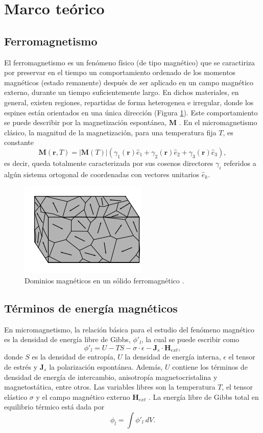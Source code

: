 \newpage
\section{Marco teórico}
\subsection{Ferromagnetismo}

El ferromagnetismo es un fenómeno físico (de tipo magnético) que se caractiriza por preservar en el tiempo un comportamiento ordenado de los momentos magnéticos (estado remanente) después de ser aplicado en un campo magnético externo, durante un tiempo suficientemente largo. En dichos materiales, en general, existen regiones, repartidas de forma heterogenea e irregular, donde los espines están orientados en una única dirección (Figura \ref{fig:MagneticDomain}). Este comportamiento se puede describir por la magnetización espontánea, $\mathbf{M}$ \cite{coey_2010}. En el micromagnetismo clásico, la magnitud de la magnetización, para una temperatura fija $T$, es constante \cite{Exl2020} \[ \mathbf{M} (\mathbf{r},T) = |\mathbf{M} (T)| (\gamma_1 (\mathbf{r}) \hat{e}_1 + \gamma_2 (\mathbf{r}) \hat{e}_2 + \gamma_3 (\mathbf{r}) \hat{e}_3 ), \]  es decir, queda totalmente caracterizada por sus cosenos directores $\gamma_i$ referidos a algún sistema ortogonal de coordenadas con vectores unitarios $\hat{e}_k$. 
\begin{figure}[!htp]
    \centering
    \includegraphics{Figuras/MagneticDomain.png}
    \renewcommand{\figurename}{\textbf{Figura}}
    \renewcommand\thefigure{\textbf{\arabic{figure}}}
    \caption{Dominios magnéticos en un sólido ferromagnético \cite{coey_2010}.}
    \label{fig:MagneticDomain}
\end{figure}
\subsection{Términos de energía magnéticos}
En micromagnetismo, la relación básica para el estudio del fenómeno magnético es la densidad de energía libre de Gibbs, $\phi'_l$, la cual se puede escribir como \[ \phi'_l = U - T S - \sigma \cdot \epsilon - \mathbf{J}_s \cdot \mathbf{H}_{ext},\] donde $S$ es la densidad de entropía, $U$ la densidad de energía interna, $\epsilon$ el tensor de estrés y $\mathbf{J}_s$ la polarización espontánea. Además, $U$ contiene los términos de densidad de energía de intercambio, anisotropía magnetocristalina y magnetostática, entre otros. Las variables libres son la temperatura $T$, el tensor elástico $\sigma$ y el campo magnético externo $\mathbf{H}_{ext}$ \cite{KronmüllerMicromagnetism,Exl2020}. La energía libre de Gibbs total en equilibrio térmico está dada por \[ \phi_l = \int \phi'_l ~ dV .\]
